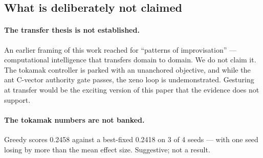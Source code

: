 \documentclass[man,12pt,floatsintext]{apa7}
\newif\ifdraftnotes
\newcommand{\owed}[1]{\ifdraftnotes\textcolor{owedcol}{\small\textbf{[OWED:} #1\textbf{]}}\fi}
\newcommand{\dnote}[1]{\ifdraftnotes\textcolor{notecol}{\small\textbf{[NOTE:} #1\textbf{]}}\fi}
\begin{document}
\subsection{What is deliberately not claimed}

\dnote{Keep this subsection. It is what makes the rest credible, and the TN
is explicit that both items below are \emph{out}.}

\paragraph{The transfer thesis is not established.}
An earlier framing of this work reached for ``patterns of improvisation'' ---
computational intelligence that transfers domain to domain. We do not claim
it. The tokamak controller is parked with an unanchored objective, and
while the ant C-vector authority gate passes, the xeno loop is
undemonstrated. Gesturing at transfer would be the exciting version of this
paper that the evidence does not support.

\paragraph{The tokamak numbers are not banked.}
Greedy scores 0.2458 against a best-fixed 0.2418 on 3 of 4 seeds --- with
one seed losing by more than the mean effect size. Suggestive; not a
result.

\owed{Decide whether the tokamak appears at all. If it does not,
\texttt{figures/tokamak\_run\_figure.png} is unused and the two paragraphs
above shrink to one sentence. The TN lists the figure as
``if the tokamak appears at all''. Current recommendation: cut it --- the
paper is complete without it and the numbers invite a fight we do not need
to have.}

\printbibliography
\end{document}

